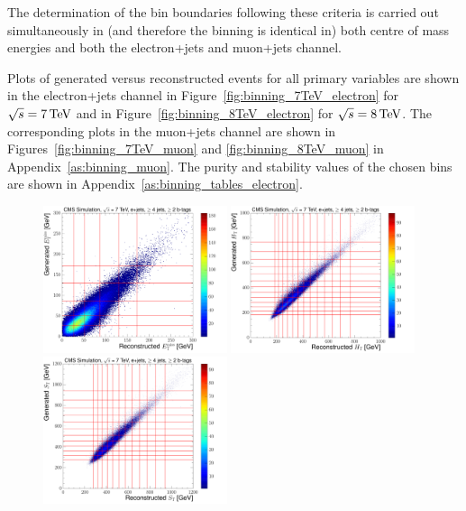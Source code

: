 The determination of the bin boundaries following these criteria is carried out simultaneously in (and
therefore the binning is identical in) both centre of mass energies and both the electron+jets and
muon+jets channel.

Plots of generated versus reconstructed events for all primary variables are shown in the electron+jets
channel in Figure~\ref{fig:binning_7TeV_electron} for $\sqrt{s}=7\,\text{Te\hspace{-.08em}V}$ and in
Figure~\ref{fig:binning_8TeV_electron} for $\sqrt{s}=8\,\text{Te\hspace{-.08em}V}$. The corresponding plots in the muon+jets channel
are shown in Figures~\ref{fig:binning_7TeV_muon} and \ref{fig:binning_8TeV_muon} in
Appendix~\ref{as:binning_muon}. The purity and stability values of the chosen bins are shown in
Appendix~\ref{as:binning_tables_electron}.

\begin{figure}[hbtp]
	\centering
     \includegraphics[width=0.48\textwidth]{Chapters/04_Analysis/04b_XSections/images/binning/electron_MET_7TeV.pdf}\hfill
     \includegraphics[width=0.48\textwidth]{Chapters/04_Analysis/04b_XSections/images/binning/electron_HT_7TeV.pdf}\\
     \includegraphics[width=0.48\textwidth]{Chapters/04_Analysis/04b_XSections/images/binning/electron_ST_7TeV.pdf}\hfill

\end{figure}
